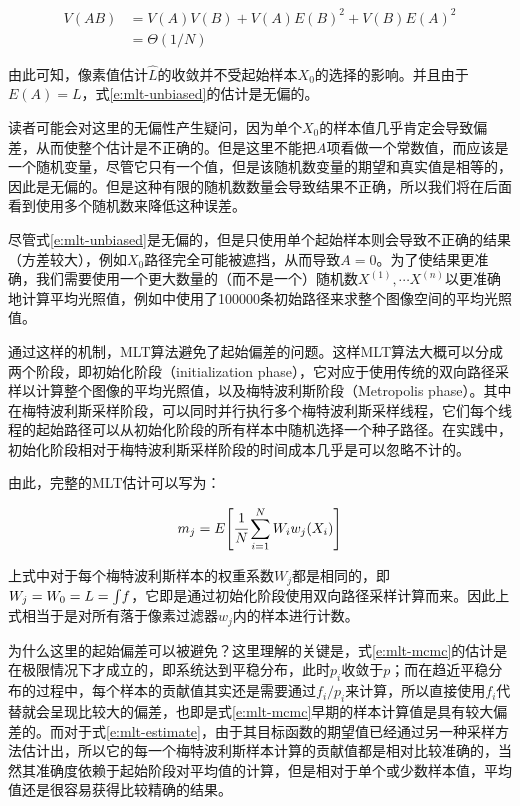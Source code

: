 \begin{equation}
\begin{aligned}
	V(AB)&=V(A)V(B)+V(A)E(B)^{2}+V(B)E(A)^{2}\\
	     &=\Theta(1/N)
\end{aligned}
\end{equation}

由此可知，像素值估计$\hat{L}$的收敛并不受起始样本$X_0$的选择的影响。并且由于$E(A)={L}$，式\ref{e:mlt-unbiased}的估计是无偏的。

\begin{myshaded}
	读者可能会对这里的无偏性产生疑问，因为单个$X_0$的样本值几乎肯定会导致偏差，从而使整个估计是不正确的。但是这里不能把$A$项看做一个常数值，而应该是一个随机变量，尽管它只有一个值，但是该随机数变量的期望和真实值是相等的，因此是无偏的。但是这种有限的随机数数量会导致结果不正确，所以我们将在后面看到使用多个随机数来降低这种误差。
\end{myshaded}

尽管式\ref{e:mlt-unbiased}是无偏的，但是只使用单个起始样本则会导致不正确的结果（方差较大），例如${X}_0$路径完全可能被遮挡，从而导致$A=0$。为了使结果更准确，我们需要使用一个更大数量的（而不是一个）随机数${X}^{(1)},\cdots{X}^{(n)}$以更准确地计算平均光照值，例如\cite{b:pbrt}中使用了100000条初始路径来求整个图像空间的平均光照值。

通过这样的机制，MLT算法避免了起始偏差的问题。这样MLT算法大概可以分成两个阶段，即初始化阶段（initialization phase），它对应于使用传统的双向路径采样以计算整个图像的平均光照值，以及梅特波利斯阶段（Metropolis phase）。其中在梅特波利斯采样阶段，可以同时并行执行多个梅特波利斯采样线程，它们每个线程的起始路径可以从初始化阶段的所有样本中随机选择一个种子路径。在实践中，初始化阶段相对于梅特波利斯采样阶段的时间成本几乎是可以忽略不计的。

由此，完整的MLT估计可以写为：

\begin{equation}\label{e:mlt-estimate}
	m_j=E\Biggl[  \cfrac{1}{N}\sum^{N}_{i=1}W_iw_j({X}_i)\Biggl]
\end{equation}

上式中对于每个梅特波利斯样本的权重系数$W_j$都是相同的，即$W_j=W_0={L}={\rm \int} f$，它即是通过初始化阶段使用双向路径采样计算而来。因此上式相当于是对所有落于像素过滤器$w_j$内的样本进行计数。

\begin{myshaded}
	为什么这里的起始偏差可以被避免？这里理解的关键是，式\ref{e:mlt-mcmc}的估计是在极限情况下才成立的，即系统达到平稳分布，此时$p_i$收敛于$p$；而在趋近平稳分布的过程中，每个样本的贡献值其实还是需要通过$f_i/p_i$来计算，所以直接使用$f_i$代替就会呈现比较大的偏差，也即是式\ref{e:mlt-mcmc}早期的样本计算值是具有较大偏差的。而对于式\ref{e:mlt-estimate}，由于其目标函数的期望值已经通过另一种采样方法估计出，所以它的每一个梅特波利斯样本计算的贡献值都是相对比较准确的，当然其准确度依赖于起始阶段对平均值的计算，但是相对于单个或少数样本值，平均值还是很容易获得比较精确的结果。
\end{myshaded}

